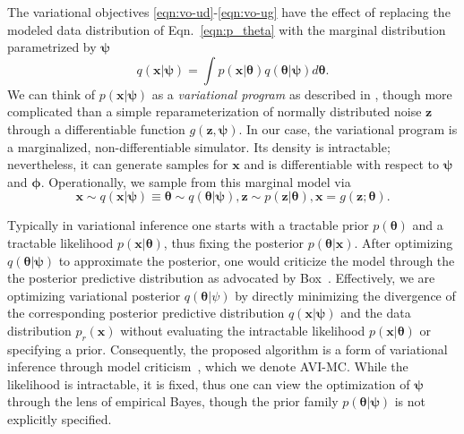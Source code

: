 \documentclass[twocolumn,superscriptaddress,aps]{revtex4-1}
\newcommand{\qxpsi}{q(\mathbf{x}|\bfpsi)}
\newcommand{\bftheta}{{\bm \theta}}
\newcommand{\bfpsi}{{\bm \psi}}
\newcommand{\bfphi}{{\bm \phi}}
\newcommand{\bfx}{\mathbf{x}}
\newcommand{\bfz}{\mathbf{z}}
\theoremstyle{plain}
\begin{document}
The variational objectives \ref{eqn:vo-ud}-\ref{eqn:vo-ug}
have the effect of replacing the modeled data distribution of Eqn.~\ref{eqn:p_theta} with
the marginal distribution parametrized by $\bfpsi$
\begin{equation}
    \qxpsi = \int  p(\mathbf{x}|\bftheta) q(\bftheta|\bfpsi) d\bftheta.
\end{equation}
We can think of $p(\bfx|\bfpsi)$ as a \textit{variational program} as described in \citep{2016arXiv161009033R}, though more complicated than a simple reparameterization of normally distributed noise $\bfz$ through a differentiable function $g(\bfz, \bfpsi)$. In our case, the variational program is a marginalized, non-differentiable  simulator.  Its density is  intractable; nevertheless, it can generate samples for $\bfx$ and is differentiable with respect to $\bfpsi$ and $\bfphi$.
Operationally, we sample from this marginal model via
\begin{equation}\label{eqn:p_psi}
    \mathbf{x} \sim \qxpsi \equiv \bftheta \sim q(\bftheta|\bfpsi), \bfz \sim p(\bfz|\bftheta), \mathbf{x} = g(\bfz; \bftheta).
\end{equation}


Typically in variational inference one starts with a tractable prior
$p(\bftheta)$ and a tractable likelihood $p(\bfx |\bftheta )$, thus fixing the
posterior $p(\bftheta | \bfx )$.   After optimizing $q(\bftheta | \bfpsi)$ to
approximate the posterior, one would criticize the model through the the
posterior predictive distribution as advocated by Box~\citep{box1980sampling}.
Effectively, we are optimizing variational posterior $q(\bftheta | \psi)$ by
directly minimizing the  divergence of the corresponding posterior predictive
distribution $\qxpsi$ and the data distribution $p_r(\bfx)$ without evaluating
the intractable likelihood $p(\bfx | \bftheta )$ or specifying a prior.
Consequently, the proposed algorithm is a form of variational inference through
model criticism~\citep{box1980sampling}, which we denote AVI-MC. While the
likelihood is intractable, it is fixed, thus one can view the optimization of
$\bfpsi$ through the lens of empirical Bayes, though the prior family
$p(\bftheta | \bfpsi)$ is not explicitly specified.
\end{document}
